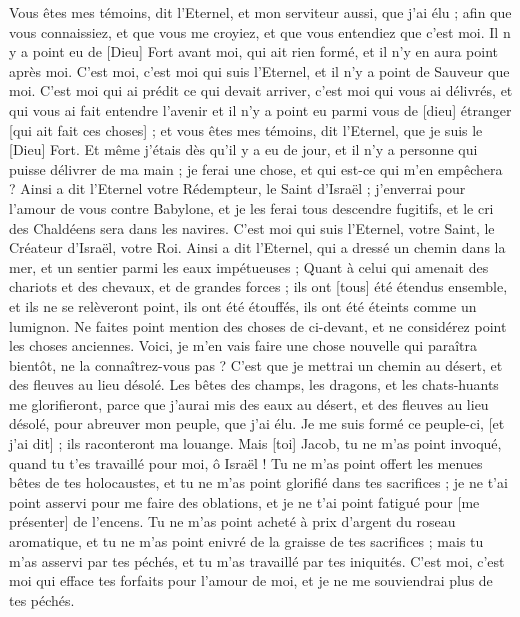 \begin{multicols}{2}
Vous êtes mes témoins, dit l'Eternel, et mon serviteur aussi, que j'ai élu ; afin que vous connaissiez, et que vous me croyiez, et que vous entendiez que c'est moi. Il n y a point eu de [Dieu] Fort avant moi, qui ait rien formé, et il n'y en aura point après moi.
C'est moi, c'est moi qui suis l'Eternel, et il n'y a point de Sauveur que moi.
C'est moi qui ai prédit ce qui devait arriver, c'est moi qui vous ai délivrés, et qui vous ai fait entendre l'avenir et il n'y a point eu parmi vous de [dieu] étranger [qui ait fait ces choses] ; et vous êtes mes témoins, dit l'Eternel, que je suis le [Dieu] Fort.
Et même j'étais dès qu'il y a eu de jour, et il n'y a personne qui puisse délivrer de ma main ; je ferai une chose, et qui est-ce qui m'en empêchera ?
Ainsi a dit l'Eternel votre Rédempteur, le Saint d'Israël ; j'enverrai pour l'amour de vous contre Babylone, et je les ferai tous descendre fugitifs, et le cri des Chaldéens sera dans les navires.
C'est moi qui suis l'Eternel, votre Saint, le Créateur d'Israël, votre Roi.
Ainsi a dit l'Eternel, qui a dressé un chemin dans la mer, et un sentier parmi les eaux impétueuses ;
Quant à celui qui amenait des chariots et des chevaux, et de grandes forces ; ils ont [tous] été étendus ensemble, et ils ne se relèveront point, ils ont été étouffés, ils ont été éteints comme un lumignon.
Ne faites point mention des choses de ci-devant, et ne considérez point les choses anciennes.
Voici, je m'en vais faire une chose nouvelle qui paraîtra bientôt, ne la connaîtrez-vous pas ? C'est que je mettrai un chemin au désert, et des fleuves au lieu désolé.
Les bêtes des champs, les dragons, et les chats-huants me glorifieront, parce que j'aurai mis des eaux au désert, et des fleuves au lieu désolé, pour abreuver mon peuple, que j'ai élu.
Je me suis formé ce peuple-ci, [et j'ai dit] ; ils raconteront ma louange.
Mais [toi] Jacob, tu ne m'as point invoqué, quand tu t'es travaillé pour moi, ô Israël !
Tu ne m'as point offert les menues bêtes de tes holocaustes, et tu ne m'as point glorifié dans tes sacrifices ; je ne t'ai point asservi pour me faire des oblations, et je ne t'ai point fatigué pour [me présenter] de l'encens.
Tu ne m'as point acheté à prix d'argent du roseau aromatique, et tu ne m'as point enivré de la graisse de tes sacrifices ; mais tu m'as asservi par tes péchés, et tu m'as travaillé par tes iniquités.
C'est moi, c'est moi qui efface tes forfaits pour l'amour de moi, et je ne me souviendrai plus de tes péchés.

\end{multicols}
